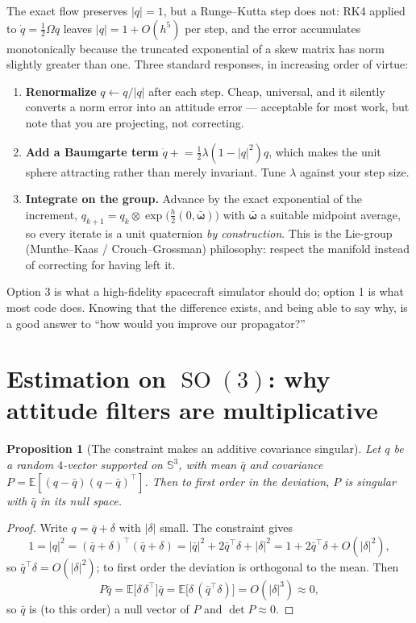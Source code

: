 \documentclass[11pt]{article}
\DeclareMathOperator{\SO}{SO}
\newcommand{\Sph}{\mathbb{S}}
\theoremstyle{plain}
\newtheorem{proposition}[theorem]{Proposition}
\theoremstyle{definition}
\begin{document}
\begin{pitfall}
The exact flow preserves $|q|=1$, but a Runge--Kutta step does not: RK4 applied to
$\dot q=\tfrac12\Omega q$ leaves $|q|=1+O(h^5)$ per step, and the error accumulates monotonically
because the truncated exponential of a skew matrix has norm slightly greater than one. Three
standard responses, in increasing order of virtue:
\begin{enumerate}[leftmargin=1.4em,topsep=2pt]
\item \textbf{Renormalize} $q\leftarrow q/|q|$ after each step. Cheap, universal, and it silently
converts a norm error into an attitude error --- acceptable for most work, but note that you are
projecting, not correcting.
\item \textbf{Add a Baumgarte term} $\dot q\mathrel{+}=\tfrac12\lambda(1-|q|^2)q$, which makes the
unit sphere attracting rather than merely invariant. Tune $\lambda$ against your step size.
\item \textbf{Integrate on the group.} Advance by the exact exponential of the increment,
$q_{k+1}=q_k\otimes\exp\!\big(\tfrac{h}{2}(0,\bar{\bm\omega})\big)$ with
$\bar{\bm\omega}$ a suitable midpoint average, so every iterate is a unit quaternion \emph{by
construction}. This is the Lie-group (Munthe--Kaas / Crouch--Grossman) philosophy: respect the
manifold instead of correcting for having left it.
\end{enumerate}
Option 3 is what a high-fidelity spacecraft simulator should do; option 1 is what most code does.
Knowing that the difference exists, and being able to say why, is a good answer to ``how would you
improve our propagator?''
\end{pitfall}

\section{Estimation on $\SO(3)$: why attitude filters are multiplicative}

\begin{proposition}[The constraint makes an additive covariance singular]\label{prop:singular}
Let $q$ be a random $4$-vector supported on $\Sph^3$, with mean $\bar q$ and covariance
$P=\mathbb E[(q-\bar q)(q-\bar q)^{\!\top}]$. Then to first order in the deviation, $P$ is singular
with $\bar q$ in its null space.
\end{proposition}

\begin{proof}
Write $q=\bar q+\delta$ with $|\delta|$ small. The constraint gives
\[
1=|q|^2=(\bar q+\delta)^{\!\top}(\bar q+\delta)=|\bar q|^2+2\bar q^{\!\top}\delta+|\delta|^2
=1+2\bar q^{\!\top}\delta+O(|\delta|^2),
\]
so $\bar q^{\!\top}\delta=O(|\delta|^2)$; to first order the deviation is orthogonal to the mean.
Then
\[
P\bar q=\mathbb E\big[\delta\,\delta^{\!\top}\big]\bar q=\mathbb E\big[\delta\,(\bar q^{\!\top}\delta)\big]
=O(|\delta|^3)\approx 0 ,
\]
so $\bar q$ is (to this order) a null vector of $P$ and $\det P\approx0$.
\end{proof}
\end{document}
